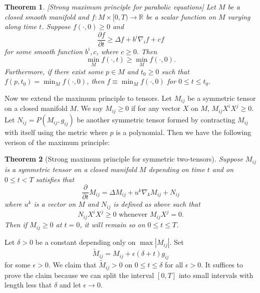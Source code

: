 \documentclass[a4paper]{report}
\newtheorem{theorem}{Theorem}
\newcommand{\R}{\mathbb{R}}
\theoremstyle{remark}
\begin{document}
\begin{theorem} \label{thm:MPP}[Strong maximum principle for parabolic equations]
	Let $M$ be a closed smooth manifold and $f: M \times [0,T) \to \R$ be a scalar function on $M$ varying along time $t$. Suppose $f (\cdot,0) \geq 0$ and
	\[
		\frac{\partial f}{\partial t} \geq \Delta f + b^{i} \nabla_{i}^{} f+ cf
	\]
	for some smooth function $b^i,c$, where $c \geq 0.$ Then
	\[\min _M f (\cdot,t) \geq \min _M f (\cdot,0).\]
	Furthermore, if there exist some $p \in M$ and $t_0 \geq 0$ such that $f(p,t_0)=\min _M f (\cdot,0) $, then $f \equiv \min _M f (\cdot,0)$ for $0 \leq t \leq t_0.$
\end{theorem}

Now we extend the maximum principle to tensors. Let $M_{ij}$ be a symmetric tensor on a closed manifold $M$. We say $M_{ij }^{} \geq 0 $ if for any vector $X$ on $M$, $M_{ij }^{} X^i X^j \geq 0$. Let $N_{ij }^{} = P(M_{ij }^{} , g_{ij}^{} )$ be another symmetric tensor formed by contracting $M_{ij }^{} $ with itself using the metric where $p$ is a polynomial. Then we have the following verison of the maximum principle:

\begin{theorem}[Strong maximum principle for symmetric two-tensors] \label{thm:MP2T}
	Suppose $M_{ij }^{} $ is a symmetric tensor on a closed manifold $M$ depending on time $t$ and on $0 \leq t < T$ satisfies that \[\frac{\partial }{\partial t} M_{ij }^{} = \Delta M_{ij }^{} + u^k \nabla_{k}^{} M_{ij }^{} + N_{ij }^{} \] where $u^k$ is a vector on $M$ and $N_{ij }^{} $ is defined as above such that 
	\[
		N_{ij }^{} X^i X^j \geq 0 \text{   whenever  } M_{ij }^{} X^j =0.
	\]
	Then if $M_{ij }^{} \geq 0$ at $t=0$, it will remain so on $0 \leq t \leq T$.
\end{theorem}

Let $\delta >0$ be a constant depending only on $\max \left| M_{ij }^{}  \right| $.
	Set \[\tilde{M}_{ij }^{}  = M_{ij }^{} + \epsilon (\delta +t) g_{ij}^{} \] for some $\epsilon >0$. We claim that $\tilde{M}_{ij }^{} >0$ on $0 \leq t \leq \delta $ for all $\epsilon >0$. It suffices to prove the claim because we can split the interval $[0,T]$ into small intervals with length less that $\delta$ and let $\epsilon \to 0$.
	
\end{document}

